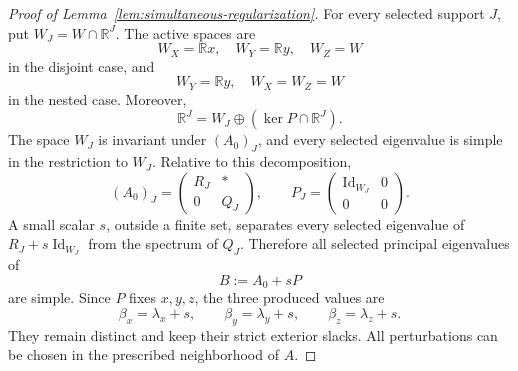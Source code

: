 \documentclass[10pt,a4paper]{amsart}
\newcommand{\Id}{\operatorname{Id}}
\newcommand{\R}{\mathbb R}
\begin{document}
\begin{proof}[Proof of Lemma~\ref{lem:simultaneous-regularization}]
For every selected support $J$, put $W_J=W\cap\R^J$. The active spaces
are
$$
W_X=\R x,\quad W_Y=\R y,\quad W_Z=W
$$
in the disjoint case, and
$$
W_Y=\R y,\quad W_X=W_Z=W
$$
in the nested case. Moreover,
$$
\R^J=W_J\oplus(\ker P\cap\R^J).
$$
The space $W_J$ is invariant under $(A_0)_J$, and every selected
eigenvalue is simple in the restriction to $W_J$. Relative to this
decomposition,
$$
(A_0)_J=
\begin{pmatrix}
R_J&*\\
0&Q_J
\end{pmatrix},
\qquad
P_J=
\begin{pmatrix}
\Id_{W_J}&0\\
0&0
\end{pmatrix}.
$$
A small scalar $s$, outside a finite set, separates every selected
eigenvalue of $R_J+s\Id_{W_J}$ from the spectrum of $Q_J$. Therefore
all selected principal eigenvalues of
$$
B:=A_0+sP
$$
are simple. Since $P$ fixes $x,y,z$, the three produced values are
$$
\beta_x=\lambda_x+s,
\qquad
\beta_y=\lambda_y+s,
\qquad
\beta_z=\lambda_z+s.
$$
They remain distinct and keep their strict exterior slacks. All
perturbations can be chosen in the prescribed neighborhood of $A$.
\end{proof}
\end{document}
